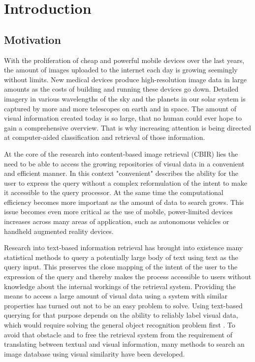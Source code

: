 \chapter{Introduction}\label{ch:introduction}

\section{Motivation}

With the proliferation of cheap and powerful mobile devices over the last
years, the amount of images uploaded to the internet each day is growing
seemingly without limits. New medical devices produce high-resolution image
data in large amounts as the costs of building and running these devices go
down. Detailed imagery in various wavelengths of the sky and the planets in our
solar system is captured by more and more telescopes on earth and in space. The
amount of visual information created today is so large, that no human could
ever hope to gain a comprehensive overview. That is why increasing attention is
being directed at computer-aided classification and retrieval of those
information.

At the core of the research into content-based image retrieval (CBIR) lies the
need to be able to access the growing repositories of visual data in a
convenient and efficient manner.  In this context "convenient" describes the
ability for the user to express the query without a complex reformulation of
the intent to make it accessible to the query processor. At the same time the
computational efficiency becomes more important as the amount of data to search
grows. This issue becomes even more critical as the use of mobile,
power-limited devices increases across many areas of application, such as
autonomous vehicles or handheld augmented reality devices.

Research into text-based information retrieval has brought into existence many
statistical methods to query a potentially large body of text using text as the
query input. This preserves the close mapping of the intent of the user to the
expression of the query and thereby makes the process accessible to users
without knowledge about the internal workings of the retrieval system.
Providing the means to access a large amount of visual data using a system with
similar properties has turned out not to be an easy problem to solve. Using
text-based querying for that purpose depends on the ability to reliably label
visual data, which would require solving the general object recognition problem
first \autocite{smeulders_content-based_2000}. To avoid that obstacle and to
free the retrieval system from the requirement of translating between textual
and visual information, many methods to search an image database using visual
similarity have been developed.

